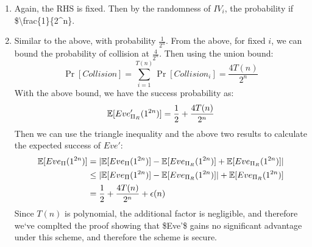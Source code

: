 \documentclass{article}
\begin{document}
\begin{enumerate}
\begin{enumerate}[,label=\alph*.]
\begin{enumerate}[noitemsep,topsep=\mdcompacttopsep,label=\alph*.]
\item{}Again, the RHS is fixed. Then by the randomness of $IV_i$, the probability if \$\textbackslash{}frac\{1\}\{2\textasciicircum{}n\}.%

\item{}
Similar to the above, with probability $\frac{1}{2^n}$.%
From the above, for fixed $i$, we can bound the probability of collision at $\frac{4}{2^n}$. Then
using the union bound:
\noindent\noindent\[%
\Pr[Collision] = \sum_{i=1}^{T(n)} \Pr[Collision_i] = \frac{4T(n)}{2^n}
\]%
With the above bound, we have the success probability as:
\noindent\noindent\[%
\E[Eve'_{\Pi_R}(1^{2n})] = \frac{1}{2} + \frac{4T(n)}{2^n}
\]%
Then we can use the triangle inequality and the above two results to calculate the expected success
of $Eve'$:
\noindent\noindent\[%
\begin{aligned}
\E[Eve_{\Pi}(1^{2n})] &= |\E[Eve_{\Pi}(1^{2n})] - \E[Eve_{\Pi_R}(1^{2n})] + \E[Eve_{\Pi_R}(1^{2n})]| \\
&\leq |\E[Eve_{\Pi}(1^{2n})] - \E[Eve_{\Pi_R}(1^{2n})]| + \E[Eve_{\Pi_R}(1^{2n})] \\
&= \frac{1}{2} + \frac{4T(n)}{2^n} +  \epsilon(n)
\end{aligned}
\]%
Since $T(n)$ is polynomial, the additional factor is negligible, and therefore we\textquoteleft{}ve complted the proof
showing that \$Eve\textquoteright{}\$ gains no significant advantage under this scheme, and therefore the scheme is
secure.%
\end{enumerate}%
\end{enumerate}%
\end{enumerate}%
\end{document}
